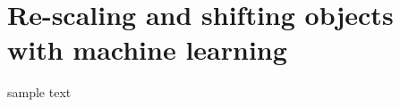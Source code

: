 \documentclass[book.tex]{subfiles}
\begin{document}
\chapter{Re-scaling and shifting objects with machine learning}

sample text
\end{document}
